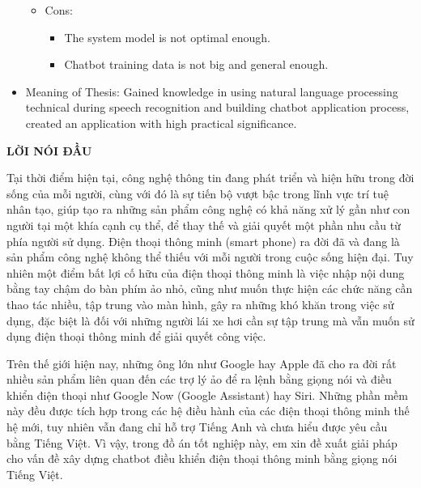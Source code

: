 \documentclass[12pt]{report}
\begin{document}
\begin{itemize}
\begin{itemize}
\begin{itemize}
		\end{itemize}
		\item Cons:
		\begin{itemize}
			\item The system model is not optimal enough.
			\item Chatbot training data is not big and general enough.
		\end{itemize}
	\end{itemize}
	\item Meaning of Thesis: Gained knowledge in using natural language processing technical during speech recognition and building chatbot application process, created an application with high practical significance.
\end{itemize}

\newpage
\tableofcontents

\newpage
\listoffigures
{}

\newpage
\listoftables
{}

\newpage
\lstlistoflistings
{}

\newpage
\begin{center}
{\large \textbf{LỜI NÓI ĐẦU}}
\end{center}
Tại thời điểm hiện tại, công nghệ thông tin đang phát triển và hiện hữu trong đời sống của mỗi người, cùng với đó là sự tiến bộ vượt bậc trong lĩnh vực trí tuệ nhân tạo, giúp tạo ra những sản phẩm công nghệ có khả năng xử lý gần như con người tại một khía cạnh cụ thể, để thay thế và giải quyết một phần nhu cầu từ phía người sử dụng. Điện thoại thông minh (smart phone) ra đời đã và đang là sản phẩm công nghệ không thể thiếu với mỗi người trong cuộc sống hiện đại. Tuy nhiên một điểm bất lợi cố hữu của điện thoại thông minh là việc nhập nội dung bằng tay chậm do bàn phím ảo nhỏ, cũng như muốn thực hiện các chức năng cần thao tác nhiều, tập trung vào màn hình, gây ra những khó khăn trong việc sử dụng, đặc biệt là đối với những người lái xe hơi cần sự tập trung mà vẫn muốn sử dụng điện thoại thông minh để giải quyết công việc.

Trên thế giới hiện nay, những ông lớn như Google hay Apple đã cho ra đời rất nhiều sản phẩm liên quan đến các trợ lý ảo để ra lệnh bằng giọng nói và điều khiển điện thoại như Google Now (Google Assistant) hay Siri. Những phần mềm này đều được tích hợp trong các hệ điều hành của các điện thoại thông minh thế hệ mới, tuy nhiên vẫn đang chỉ hỗ trợ Tiếng Anh và chưa hiểu được yêu cầu bằng Tiếng Việt. Vì vậy, trong đồ án tốt nghiệp này, em xin đề xuất giải pháp cho vấn đề xây dựng chatbot điều khiển điện thoại thông minh bằng giọng nói Tiếng Việt.
\end{document}
